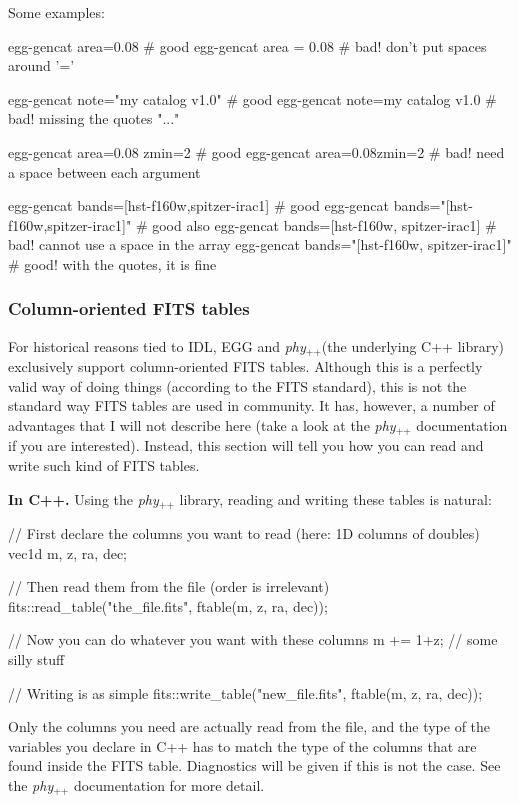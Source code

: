 \documentclass[12pt,a4paper]{article}
\newcommand{\phypp}{\textit{phy}$_{\text{++}}$\xspace}
\newcommand{\egg}{\textsc{EGG}\xspace}
\begin{document}
Some examples:
\begin{bashcode}
egg-gencat area=0.08        # good
egg-gencat area = 0.08      # bad! don't put spaces around '='

egg-gencat note="my catalog v1.0" # good
egg-gencat note=my catalog v1.0   # bad! missing the quotes "..."

egg-gencat area=0.08 zmin=2 # good
egg-gencat area=0.08zmin=2  # bad! need a space between each argument

egg-gencat bands=[hst-f160w,spitzer-irac1]    # good
egg-gencat bands="[hst-f160w,spitzer-irac1]"  # good also
egg-gencat bands=[hst-f160w, spitzer-irac1]   # bad! cannot use a space in the array
egg-gencat bands="[hst-f160w, spitzer-irac1]" # good! with the quotes, it is fine
\end{bashcode}

\subsubsection{Column-oriented FITS tables}

For historical reasons tied to IDL, \egg and \phypp (the underlying C++ library) exclusively support column-oriented FITS tables. Although this is a perfectly valid way of doing things (according to the FITS standard), this is not the standard way FITS tables are used in community. It has, however, a number of advantages that I will not describe here (take a look at the \phypp documentation if you are interested). Instead, this section will tell you how you can read and write such kind of FITS tables.

{\bf In C++.} Using the \phypp library, reading and writing these tables is natural:
\begin{cppcode}
// First declare the columns you want to read (here: 1D columns of doubles)
vec1d m, z, ra, dec;

// Then read them from the file (order is irrelevant)
fits::read_table("the_file.fits", ftable(m, z, ra, dec));

// Now you can do whatever you want with these columns
m += 1+z; // some silly stuff

// Writing is as simple
fits::write_table("new_file.fits", ftable(m, z, ra, dec));
\end{cppcode}
Only the columns you need are actually read from the file, and the type of the variables you declare in C++ has to match the type of the columns that are found inside the FITS table. Diagnostics will be given if this is not the case. See the \phypp documentation for more detail.
\end{document}
